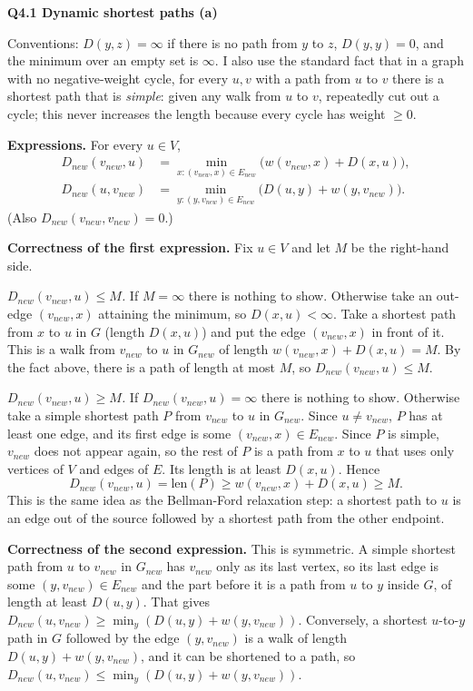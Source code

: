 \documentclass[11pt]{article}
\newcommand{\qpage}[1]{\clearpage\noindent\textbf{\large #1}\par\medskip}
\begin{document}
\qpage{Q4.1 Dynamic shortest paths (a)}

Conventions: $D(y,z) = \infty$ if there is no path from $y$ to $z$, $D(y,y) = 0$, and the minimum over an empty set is $\infty$.
I also use the standard fact that in a graph with no negative-weight cycle, for every $u,v$ with a path from $u$ to $v$ there is a shortest path that is \emph{simple}: given any walk from $u$ to $v$, repeatedly cut out a cycle; this never increases the length because every cycle has weight $\ge 0$.

\textbf{Expressions.}
For every $u \in V$,
\begin{align*}
  D_{new}(v_{new},u) &= \min_{x : (v_{new},x) \in E_{new}} \bigl( w(v_{new},x) + D(x,u) \bigr), \\
  D_{new}(u,v_{new}) &= \min_{y : (y,v_{new}) \in E_{new}} \bigl( D(u,y) + w(y,v_{new}) \bigr).
\end{align*}
(Also $D_{new}(v_{new},v_{new}) = 0$.)

\textbf{Correctness of the first expression.}
Fix $u \in V$ and let $M$ be the right-hand side.

\emph{$D_{new}(v_{new},u) \le M$.}
If $M = \infty$ there is nothing to show.
Otherwise take an out-edge $(v_{new},x)$ attaining the minimum, so $D(x,u) < \infty$.
Take a shortest path from $x$ to $u$ in $G$ (length $D(x,u)$) and put the edge $(v_{new},x)$ in front of it.
This is a walk from $v_{new}$ to $u$ in $G_{new}$ of length $w(v_{new},x) + D(x,u) = M$.
By the fact above, there is a path of length at most $M$, so $D_{new}(v_{new},u) \le M$.

\emph{$D_{new}(v_{new},u) \ge M$.}
If $D_{new}(v_{new},u) = \infty$ there is nothing to show.
Otherwise take a simple shortest path $P$ from $v_{new}$ to $u$ in $G_{new}$.
Since $u \ne v_{new}$, $P$ has at least one edge, and its first edge is some $(v_{new},x) \in E_{new}$.
Since $P$ is simple, $v_{new}$ does not appear again, so the rest of $P$ is a path from $x$ to $u$ that uses only vertices of $V$ and edges of $E$.
Its length is at least $D(x,u)$.
Hence
\[
  D_{new}(v_{new},u) = \text{len}(P) \ge w(v_{new},x) + D(x,u) \ge M.
\]
This is the same idea as the Bellman-Ford relaxation step: a shortest path to $u$ is an edge out of the source followed by a shortest path from the other endpoint.

\textbf{Correctness of the second expression.}
This is symmetric.
A simple shortest path from $u$ to $v_{new}$ in $G_{new}$ has $v_{new}$ only as its last vertex, so its last edge is some $(y,v_{new}) \in E_{new}$ and the part before it is a path from $u$ to $y$ inside $G$, of length at least $D(u,y)$.
That gives $D_{new}(u,v_{new}) \ge \min_y (D(u,y) + w(y,v_{new}))$.
Conversely, a shortest $u$-to-$y$ path in $G$ followed by the edge $(y,v_{new})$ is a walk of length $D(u,y) + w(y,v_{new})$, and it can be shortened to a path, so $D_{new}(u,v_{new}) \le \min_y(D(u,y)+w(y,v_{new}))$.
\end{document}
